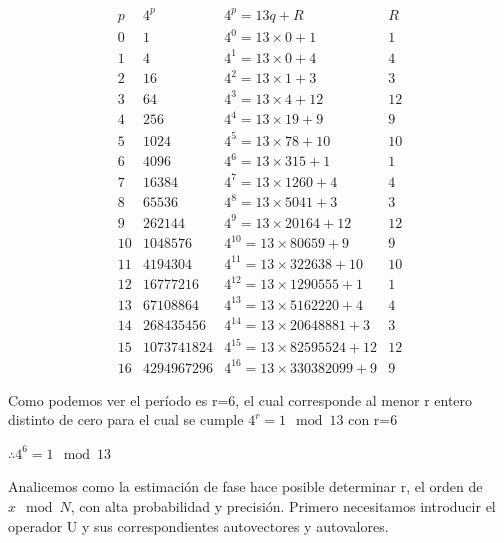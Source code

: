  \[\begin{matrix}
         p  &   4^p & 4^p = 13 q                         + R    &   R   \\
         0  &   1   & 4^0 = 13\times0                    + 1    & 1     \\
         1  &   4   & 4^1 = 13\times0                    + 4    & 4     \\
         2  &   16  & 4^2 = 13\times1                    + 3    & 3     \\
         3  &   64  & 4^3 = 13\times4                    + 12   & 12    \\
         4  &   256  & 4^4 = 13\times19                  + 9    & 9     \\
         5  &   1024  & 4^5 = 13\times78                 + 10   & 10    \\ %
         6  &   4096  & 4^6 = 13\times315                + 1    & 1     \\
         7  &   16384  & 4^7 = 13\times1260              + 4    & 4     \\
         8  &   65536  & 4^8 = 13\times5041              + 3    & 3     \\
         9  &   262144  & 4^9 = 13\times20164            + 12   & 12    \\
         10 &   1048576  & 4^10 = 13\times80659          + 9    & 9     \\
         11 &   4194304  & 4^11 = 13\times322638         + 10   & 10    \\
         12 &   16777216  & 4^12 = 13\times1290555       + 1    & 1     \\
         13 &   67108864  & 4^13 = 13\times5162220       + 4    & 4     \\
         14 &   268435456  & 4^14 = 13\times20648881     + 3    & 3     \\
         15 &   1073741824  & 4^15 = 13\times82595524    + 12   & 12    \\
         16 &   4294967296  & 4^16 = 13\times330382099   + 9    & 9     
     \end{matrix}
 \]

 Como podemos ver el período es r=6, el cual corresponde al menor r entero distinto de cero para el cual se cumple $4^r=1 \mod 13$ con r=6

 $\therefore 4^6 = 1 \mod 13$

Analicemos como la estimación de fase hace posible determinar r, el orden de $x \mod N$, con alta probabilidad y precisión. Primero necesitamos introducir el operador U y sus correspondientes autovectores y autovalores.

